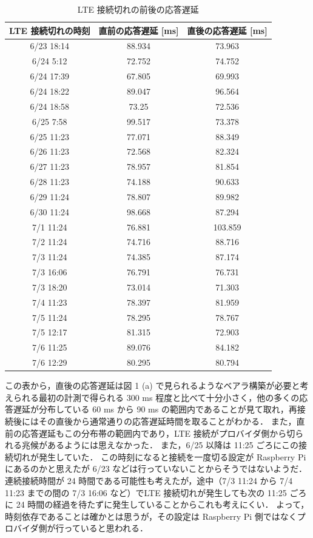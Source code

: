 \documentclass[a4j]{jarticle}
\begin{document}
\begin{table}[tb]
\centering
\caption{LTE 接続切れの前後の応答遅延}
\label{1}
\begin{tabular}{|c|c|c|}
\hline
LTE 接続切れの時刻&直前の応答遅延 [ms] &直後の応答遅延 [ms]\\
\hline
6/23 18:14 & 88.934 & 73.963\\
\hline
6/24 5:12 & 72.752 & 74.752\\
\hline
6/24 17:39 & 67.805 & 69.993\\
\hline
6/24 18:22 & 89.047 & 96.564\\
\hline
6/24 18:58 & 73.25 & 72.536\\
\hline
6/25 7:58& 99.517 & 73.378\\
\hline
6/25 11:23 & 77.071 & 88.349\\
\hline
6/26 11:23 & 72.568 & 82.324\\
\hline
6/27 11:23 & 78.957 & 81.854\\
\hline
6/28 11:23 & 74.188 & 90.633\\
\hline
6/29 11:24 & 78.807 & 89.982\\
\hline
6/30 11:24 & 98.668 & 87.294\\
\hline
7/1 11:24  & 76.881 & 103.859\\
\hline
7/2 11:24  & 74.716 & 88.716\\
\hline
7/3 11:24  & 74.385 & 87.174\\
\hline
7/3 16:06  & 76.791 & 76.731\\
\hline
7/3 18:20  & 73.014 & 71.303\\
\hline
7/4 11:23  & 78.397 & 81.959\\
\hline
7/5 11:24  & 78.295 & 78.767\\
\hline
7/5 12:17  & 81.315 & 72.903\\
\hline
7/6 11:25  & 89.076 & 84.182\\
\hline
7/6 12:29  & 80.295 & 80.794\\
\hline
\end{tabular}
\end{table}
この表から，直後の応答遅延は図 1 (a) で見られるようなベアラ構築が必要と考えられる最初の計測で得られる 300 ms 程度と比べて十分小さく，他の多くの応答遅延が分布している 60 ms から 90 ms の範囲内であることが見て取れ，再接続後にはその直後から通常通りの応答遅延時間を取ることがわかる．
また，直前の応答遅延もこの分布帯の範囲内であり，LTE 接続がプロバイダ側から切られる兆候があるようには思えなかった．
また，6/25 以降は 11:25 ごろにこの接続切れが発生していた．
この時刻になると接続を一度切る設定が Raspberry Pi にあるのかと思えたが 6/23 などは行っていないことからそうではないようだ．
連続接続時間が 24 時間である可能性も考えたが，途中（7/3 11:24 から 7/4 11:23 までの間の 7/3 16:06 など）でLTE 接続切れが発生しても次の 11:25 ごろに 24 時間の経過を待たずに発生していることからこれも考えにくい．
よって，時刻依存であることは確かとは思うが，その設定は Raspberry Pi 側ではなくプロバイダ側が行っていると思われる．
\end{document}
